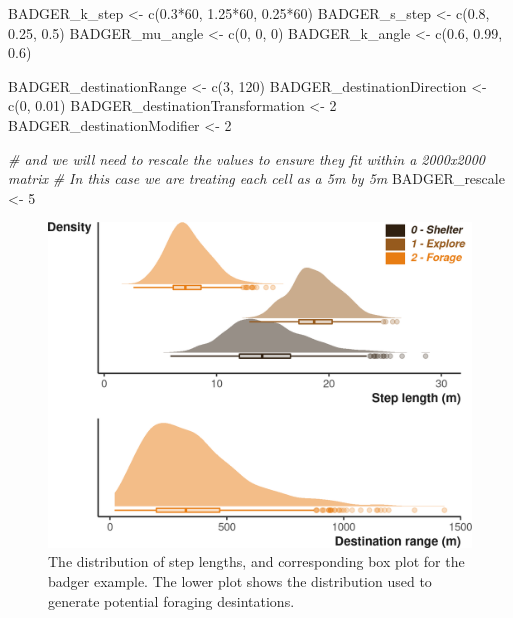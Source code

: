 \documentclass[10pt,a4paper]{article}
\newenvironment{Shaded}{}{}
\newcommand{\CommentTok}[1]{\textit{#1}}
\newcommand{\DecValTok}[1]{#1}
\newcommand{\FloatTok}[1]{#1}
\newcommand{\FunctionTok}[1]{#1}
\newcommand{\NormalTok}[1]{#1}
\newcommand{\OtherTok}[1]{#1}
\newcommand{\SpecialCharTok}[1]{#1}
\begin{document}
\begin{Shaded}
\begin{Highlighting}[]
\NormalTok{BADGER\_k\_step }\OtherTok{\textless{}{-}} \FunctionTok{c}\NormalTok{(}\FloatTok{0.3}\SpecialCharTok{*}\DecValTok{60}\NormalTok{, }\FloatTok{1.25}\SpecialCharTok{*}\DecValTok{60}\NormalTok{, }\FloatTok{0.25}\SpecialCharTok{*}\DecValTok{60}\NormalTok{)}
\NormalTok{BADGER\_s\_step }\OtherTok{\textless{}{-}} \FunctionTok{c}\NormalTok{(}\FloatTok{0.8}\NormalTok{, }\FloatTok{0.25}\NormalTok{, }\FloatTok{0.5}\NormalTok{)}
\NormalTok{BADGER\_mu\_angle }\OtherTok{\textless{}{-}} \FunctionTok{c}\NormalTok{(}\DecValTok{0}\NormalTok{, }\DecValTok{0}\NormalTok{, }\DecValTok{0}\NormalTok{)}
\NormalTok{BADGER\_k\_angle }\OtherTok{\textless{}{-}} \FunctionTok{c}\NormalTok{(}\FloatTok{0.6}\NormalTok{, }\FloatTok{0.99}\NormalTok{, }\FloatTok{0.6}\NormalTok{)}

\NormalTok{BADGER\_destinationRange }\OtherTok{\textless{}{-}} \FunctionTok{c}\NormalTok{(}\DecValTok{3}\NormalTok{, }\DecValTok{120}\NormalTok{)}
\NormalTok{BADGER\_destinationDirection }\OtherTok{\textless{}{-}} \FunctionTok{c}\NormalTok{(}\DecValTok{0}\NormalTok{, }\FloatTok{0.01}\NormalTok{)}
\NormalTok{BADGER\_destinationTransformation }\OtherTok{\textless{}{-}} \DecValTok{2}
\NormalTok{BADGER\_destinationModifier }\OtherTok{\textless{}{-}} \DecValTok{2}

\CommentTok{\# and we will need to rescale the values to ensure they fit within a 2000x2000 matrix}
\CommentTok{\# In this case we are treating each cell as a 5m by 5m}
\NormalTok{BADGER\_rescale }\OtherTok{\textless{}{-}} \DecValTok{5}
\end{Highlighting}
\end{Shaded}

\begin{figure}

{\centering \includegraphics{Agent-based_model_walkthrough_files/figure-latex/BADGERsettingMoveDesPlot-1} 

}

\caption{The distribution of step lengths, and corresponding box plot for the badger example. The lower plot shows the distribution used to generate potential foraging desintations.}\label{fig:BADGERsettingMoveDesPlot}
\end{figure}
\end{document}
